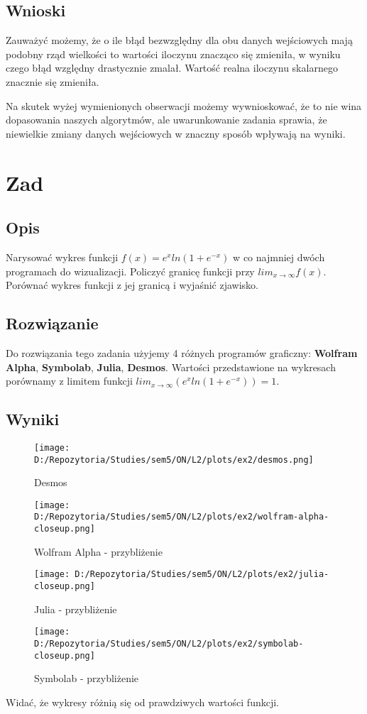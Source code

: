\documentclass[10pt,a4paper]{article}
\begin{document}
\subsection*{Wnioski}
Zauważyć możemy, że o ile błąd bezwzględny dla obu danych wejściowych mają podobny rząd wielkości to wartości iloczynu znacząco się zmieniła, w wyniku czego błąd względny drastycznie zmalał. Wartość realna iloczynu skalarnego znacznie się zmieniła.

Na skutek wyżej wymienionych obserwacji możemy wywnioskować, że to nie wina dopasowania naszych algorytmów, ale uwarunkowanie zadania sprawia, że niewielkie zmiany danych wejściowych w znaczny sposób wpływają na wyniki.
\section{Zad}
\subsection*{Opis}
Narysować wykres funkcji $f(x)=e^{x}ln(1+e^{-x})$ w co najmniej dwóch programach do wizualizacji. Policzyć granicę funkcji przy $lim_{x\rightarrow\infty}f(x)$. Porównać wykres funkcji z jej granicą i wyjaśnić zjawisko.
\subsection*{Rozwiązanie}
Do rozwiązania tego zadania użyjemy 4 różnych programów graficzny: \textbf{Wolfram Alpha}, \textbf{Symbolab}, \textbf{Julia}, \textbf{Desmos}.
Wartości przedstawione na wykresach porównamy z limitem funkcji $lim_{x\rightarrow\infty}(e^{x}ln(1+e^{-x})) = 1$.
\subsection*{Wyniki}
\begin{figure}[hbt!]
\caption{Desmos}
\centering
\texttt{[image: D:/Repozytoria/Studies/sem5/ON/L2/plots/ex2/desmos.png]}
\end{figure}
\begin{figure}[hbt!]
\caption{Wolfram Alpha - przybliżenie}
\centering
\texttt{[image: D:/Repozytoria/Studies/sem5/ON/L2/plots/ex2/wolfram-alpha-closeup.png]}
\end{figure}
\begin{figure}[hbt!]
\caption{Julia - przybliżenie}
\centering
\texttt{[image: D:/Repozytoria/Studies/sem5/ON/L2/plots/ex2/julia-closeup.png]}
\end{figure}
\begin{figure}[hbt!]
\caption{Symbolab - przybliżenie}
\centering
\texttt{[image: D:/Repozytoria/Studies/sem5/ON/L2/plots/ex2/symbolab-closeup.png]}
\end{figure}
Widać, że wykresy różnią się od prawdziwych wartości funkcji.
\end{document}
